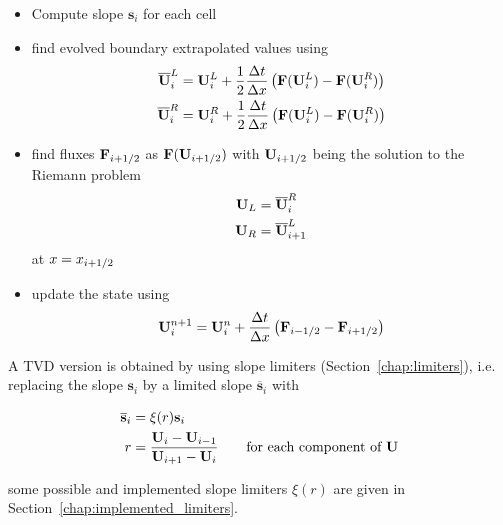 \begin{itemize}

\item Compute slope $\mathbf{s}_i$ for each cell

\item find evolved boundary extrapolated values using
\begin{align*}
\overline{\mathbf{U}}_i^L &=
	\mathbf{U}_i^L +
	\frac{1}{2} \frac{\Delta t}{\Delta x}
	\left(
		\mathbf{F}(\mathbf{U}_i^L) - \mathbf{F}(\mathbf{U}_i^R) \right)
\\
\overline{\mathbf{U}}_i^R &=
	\mathbf{U}_i^R +
	\frac{1}{2} \frac{\Delta t}{\Delta x}
	\left(
		\mathbf{F}(\mathbf{U}_i^L) - \mathbf{F}(\mathbf{U}_i^R)
	\right)
\end{align*}

\item find fluxes $\mathbf{F}_{i + 1/2}$ as $\mathbf{F}(\mathbf{U}_{i+1/2})$ with $\mathbf{U}_{i+1/2}$
being the solution to the Riemann problem
\begin{align}
	\mathbf{U}_L &= \overline{\mathbf{U}}_i^R\\
	\mathbf{U}_R &= \overline{\mathbf{U}}_{i+1}^L
\end{align}
at $ x = x_{i+1/2}$

\item update the state using
\begin{equation}
\mathbf{U}_i^{n+1} =
	\mathbf{U}_i^n +
	\frac{\Delta t}{\Delta x} \left( \mathbf{F}_{i-1/2} - \mathbf{F}_{i + 1/2} \right)
\end{equation}
\end{itemize}




A TVD version is obtained by using slope limiters (Section~\ref{chap:limiters}),
i.e. replacing the slope $\mathbf{s}_i$ by a limited slope
$\overline{\mathbf{s}}_i$ with

\begin{align*}
\overline{\mathbf{s}}_i &=
	\xi(r) \mathbf{s}_i
\\
r &=
	\frac{\mathbf{U}_i - \mathbf{U}_{i-1}}{\mathbf{U}_{i+1} -
	\mathbf{U}_{i}}
	\quad\quad \text{for each component of }\mathbf{U}
\end{align*} 

some possible and implemented slope limiters $\xi(r)$ are given in
Section~\ref{chap:implemented_limiters}.
















